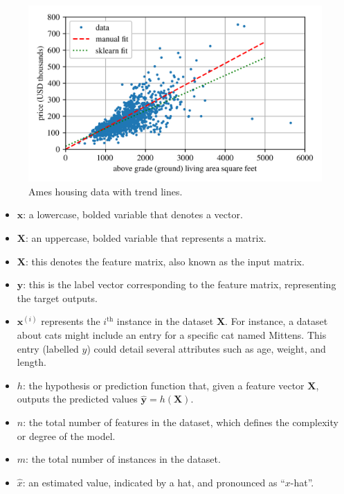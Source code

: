 \documentclass[12pt,letter]{article}
\begin{document}
\begin{figure}[H]
    \centering
    \includegraphics[]{../figures/Ames_simple_linear_regression_model_2.png}
    \caption{Ames housing data with trend lines.}
    \label{fig:GDP_data_trend}
\end{figure}








\begin{mdframed}[middlelinewidth=0.5mm]
\begin{center}
\end{center}

\begin{itemize}
    \item $\textbf{x}$: a lowercase, bolded variable that denotes a vector.
    \item $\textbf{X}$: an uppercase, bolded variable that represents a matrix.
    \item $\textbf{X}$: this denotes the feature matrix, also known as the input matrix.
    \item $\textbf{y}$: this is the label vector corresponding to the feature matrix, representing the target outputs.
    \item $\textbf{x}^{(i)}$ represents the $i^\text{th}$ instance in the dataset $\textbf{X}$. For instance, a dataset about cats might include an entry for a specific cat named Mittens. This entry (labelled $y$) could detail several attributes such as age, weight, and length.
    \item $h$: the hypothesis or prediction function that, given a feature vector $\textbf{X}$, outputs the predicted values $\hat{\textbf{y}} = h(\textbf{X})$.
    \item $n$: the total number of features in the dataset, which defines the complexity or degree of the model.
    \item $m$: the total number of instances in the dataset.
    \item $\hat{x}$: an estimated value, indicated by a hat, and pronounced as ``$x$-hat''.
\end{itemize}
\end{mdframed}
\end{document}
